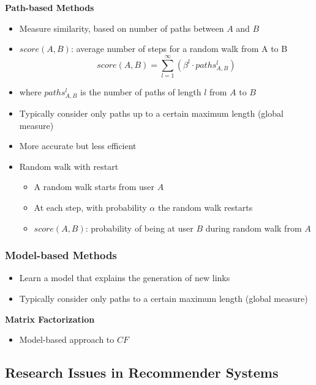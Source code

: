 \documentclass[../notes.tex]{subfiles}
\begin{document}
\textbf{Path-based Methods}
\begin{itemize}
  \item Measure similarity, based on number of paths between $A$ and $B$
  \item $score(A,B)$: average number of steps for a random walk from A to B $$score(A,B) = \sum_{l=1}^{\infty} (\beta^l\cdot paths^{l}_{A,B})$$
  \item where $paths^{l}_{A,B}$ is the number of paths of length $l$ from $A$ to $B$ 
  \item Typically consider only paths up to a certain maximum length (global measure)
  \item More accurate but less efficient
  \item Random walk with restart
  \begin{itemize}
    \item A random walk starts from user $A$
    \item At each step, with probability $\alpha$ the random walk restarts
    \item $score(A,B)$: probability of being at user $B$ during random walk from $A$
  \end{itemize}
\end{itemize}

\subsubsection{Model-based Methods}
\begin{itemize}
  \item Learn a model that explains the generation of new links
  \item Typically consider only paths to a certain maximum length (global measure)
\end{itemize}

\textbf{Matrix Factorization}
\begin{itemize}
  \item Model-based approach to $CF$
\end{itemize}


\subsection{Research Issues in Recommender Systems}
\end{document}
